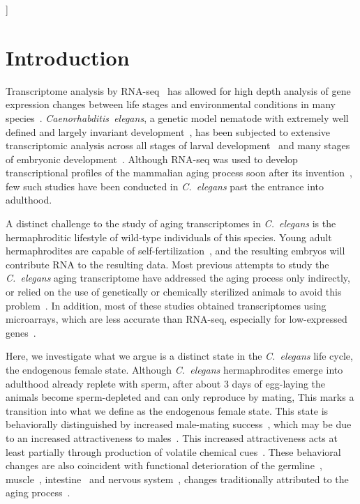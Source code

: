 \documentclass[10pt,letterpaper,twocolumn]{article}
\newcommand{\cel}{\emph{C.~elegans}}
\begin{document}
]
\nolinenumbers{}

\section*{Introduction}
\label{sec:introduction}
Transcriptome analysis by RNA-seq~\cite{Mortazavi2008} has allowed for high
depth analysis of gene expression changes between life stages and environmental
conditions in many species~\cite{Gerstein2014,Blaxter2012}.
\emph{Caenorhabditis~elegans}, a genetic model nematode with extremely
well defined and largely invariant development~\cite{Sulston1977,Sulston1983},
has been subjected to extensive transcriptomic analysis across all stages of
larval development~\cite{Hillier2009,Boeck2016,Murray2012}
and many stages of embryonic development~\cite{Boeck2016}. Although RNA-seq was
used to develop transcriptional profiles of the mammalian aging process soon
after its invention~\cite{Magalhaes2010}, few such studies have been conducted
in \cel{} past the entrance into adulthood.

A distinct challenge to the study of aging transcriptomes in \cel{} is the
hermaphroditic lifestyle of wild-type individuals of this species. Young adult
hermaphrodites are capable of
self-fertilization~\cite{Brenner1974,corsi2015transparent}, and the resulting
embryos will contribute RNA to the resulting data.
Most previous attempts to study the \cel{} aging transcriptome have addressed
the aging process only indirectly, or relied on the use of genetically or
chemically sterilized animals to avoid this
problem~\cite{Murphy2003,Halaschek-wiener2005,Lund2002,McCormick2012,Eckley2013,
Boeck2016,Rangaraju2015}.
In addition, most of these studies obtained transcriptomes using microarrays,
which are less accurate than RNA-seq, especially for low-expressed
genes~\cite{Wang2014}.

Here, we investigate what we argue is a distinct state in the \cel{} life cycle,
the endogenous female state. Although \cel{} hermaphrodites emerge into adulthood
already replete with sperm, after about 3 days of egg-laying the animals become
sperm-depleted and can only reproduce by mating, This marks a transition into
what we define as the endogenous female state. This state is behaviorally
distinguished by increased male-mating success~\cite{Garcia2007}, which may be
due to an increased attractiveness to males~\cite{Morsci2011}. This increased
attractiveness acts at least partially through production of volatile chemical
cues~\cite{Leighton2014}.
These behavioral changes are also coincident with functional deterioration of
the germline~\cite{Andux2008}, muscle~\cite{Herndon2002},
intestine~\cite{McGee2011} and nervous system~\cite{Liu2013}, changes
traditionally attributed to the aging process~\cite{golden2007gene}.
\end{document}
